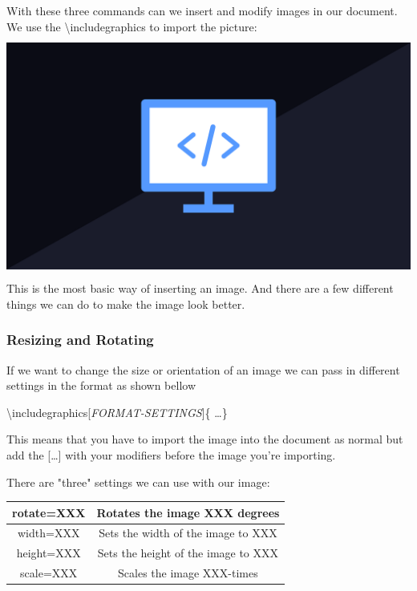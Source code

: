 \documentclass{article}
\newcommand{\bs}[1]{\textbackslash{}#1} %
\begin{document}
With these three commands can we insert and modify images in our document. We use the \bs{includegraphics} to import the picture: \\
\includegraphics[height=8cm]{Images/Programming.png} \\
This is the most basic way of inserting an image. And there are a few different things we can do to make 
the image look better.

\subsubsection{Resizing and Rotating}
If we want to change the size or orientation of an image we can pass in different settings in the format as shown bellow

\begin{center}
\bs{includegraphics[\textit{FORMAT-SETTINGS}]\{ \ldots \} } \\
\end{center}

This means that you have to import the image into the document as normal but add the [\ldots] with your modifiers
before the image you're importing. 

There are "three" settings we can use with our image:
\begin{table}[H]
    \centering
    \begin{tabular}{|c|c|} \hline
        rotate=XXX & Rotates the image XXX degrees \\ \hline
        width=XXX & Sets the width of the image to XXX \\ \hline
        height=XXX & Sets the height of the image to XXX \\ \hline
        \rowcolor{gray!30}
        scale=XXX & Scales the image XXX-times \\ \hline
    \end{tabular}
\end{table} %
\end{document}
